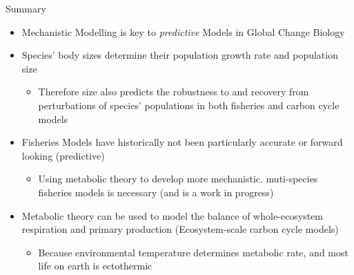 \documentclass[xcolor={usenames,x11names},compress]{beamer}
\renewcommand{\(}{\begin{columns}}
\renewcommand{\)}{\end{columns}}
\newcommand{\<}[1]{\begin{column}{#1}}
\renewcommand{\>}{\end{column}}
\begin{document}
\begin{frame}{Summary}
   
    \begin{itemize}[<+->] \setlength{\itemindent}{0em} \itemsep6pt
  
      \item Mechanistic Modelling is key to {\it predictive} Models in Global Change Biology 
      
      \item Species' body sizes determine their population growth rate and population size
      \begin{itemize}
        \item Therefore size also predicts the robustness to and recovery from perturbations of species' populations in both fisheries and carbon cycle models
      \end{itemize} 

      \item Fisheries Models have historically not been particularly accurate or forward looking (predictive)
        \begin{itemize}
          \item Using metabolic theory to develop more mechanistic. muti-species fisheries  models is necessary (and is a work in progress) 
        \end{itemize}  
        
        \item Metabolic theory can be used to model the balance of  whole-ecosystem respiration and primary production (Ecosystem-scale carbon cycle models)

        \begin{itemize}
          \item Because environmental temperature determines metabolic rate, and most life on earth is ectothermic 
        \end{itemize}  

    \end{itemize}
    
  \end{frame}  
\end{document}
